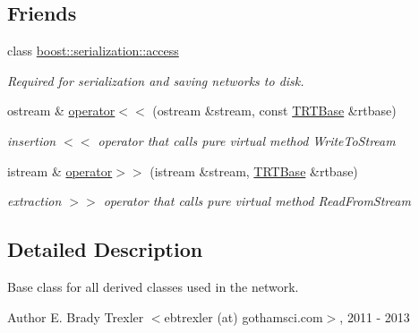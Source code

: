 \subsection*{Friends}
\begin{DoxyCompactItemize}
\item 
\hypertarget{class_t_r_t_base_ac98d07dd8f7b70e16ccb9a01abf56b9c}{class \hyperlink{class_t_r_t_base_ac98d07dd8f7b70e16ccb9a01abf56b9c}{boost\+::serialization\+::access}}\label{class_t_r_t_base_ac98d07dd8f7b70e16ccb9a01abf56b9c}

\begin{DoxyCompactList}\small\item\em Required for serialization and saving networks to disk. \end{DoxyCompactList}\item 
\hypertarget{class_t_r_t_base_a64356ce8469c8ed650b40c9e8ad51c27}{ostream \& \hyperlink{class_t_r_t_base_a64356ce8469c8ed650b40c9e8ad51c27}{operator$<$$<$} (ostream \&stream, const \hyperlink{class_t_r_t_base}{T\+R\+T\+Base} \&rtbase)}\label{class_t_r_t_base_a64356ce8469c8ed650b40c9e8ad51c27}

\begin{DoxyCompactList}\small\item\em insertion $<$$<$ operator that calls pure virtual method Write\+To\+Stream \end{DoxyCompactList}\item 
\hypertarget{class_t_r_t_base_afb059842172db7fea14d8d5f360d83b7}{istream \& \hyperlink{class_t_r_t_base_afb059842172db7fea14d8d5f360d83b7}{operator$>$$>$} (istream \&stream, \hyperlink{class_t_r_t_base}{T\+R\+T\+Base} \&rtbase)}\label{class_t_r_t_base_afb059842172db7fea14d8d5f360d83b7}

\begin{DoxyCompactList}\small\item\em extraction $>$$>$ operator that calls pure virtual method Read\+From\+Stream \end{DoxyCompactList}\end{DoxyCompactItemize}


\subsection{Detailed Description}
Base class for all derived classes used in the network. 

\begin{DoxyAuthor}{Author}
E. Brady Trexler $<$ebtrexler (at) gothamsci.\+com$>$, 2011 -\/ 2013 
\end{DoxyAuthor}


